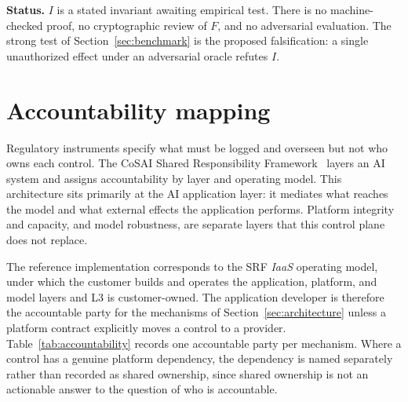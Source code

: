 \documentclass[11pt,letterpaper]{article}
\begin{document}
\textbf{Status.} $I$ is a stated invariant awaiting empirical test. There is no machine-checked proof, no cryptographic review of $F$, and no adversarial evaluation. The strong test of Section~\ref{sec:benchmark} is the proposed falsification: a single unauthorized effect under an adversarial oracle refutes $I$.

\section{Accountability mapping}\label{sec:accountability}

Regulatory instruments specify what must be logged and overseen but not who owns each control. The CoSAI Shared Responsibility Framework~\cite{cosaisrf} layers an AI system and assigns accountability by layer and operating model. This architecture sits primarily at the AI application layer: it mediates what reaches the model and what external effects the application performs. Platform integrity and capacity, and model robustness, are separate layers that this control plane does not replace.

The reference implementation corresponds to the SRF \emph{IaaS} operating model, under which the customer builds and operates the application, platform, and model layers and L3 is customer-owned. The application developer is therefore the accountable party for the mechanisms of Section~\ref{sec:architecture} unless a platform contract explicitly moves a control to a provider. Table~\ref{tab:accountability} records one accountable party per mechanism. Where a control has a genuine platform dependency, the dependency is named separately rather than recorded as shared ownership, since shared ownership is not an actionable answer to the question of who is accountable.
\end{document}
